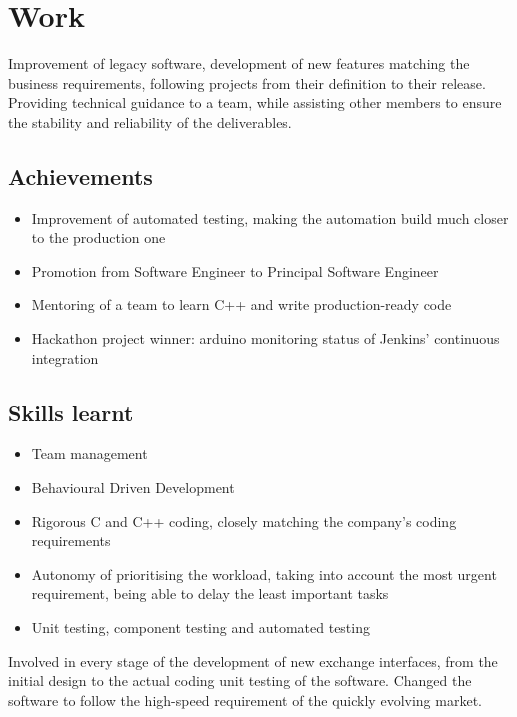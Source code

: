\documentclass{cv}
\begin{document}
\iffalse
\contact{address line 1}
        {address line 2}
        {address line 3}
        {....@.........}
        {+phone~number}
\fi

\section{Work}
{Improvement of legacy software, development of new features matching the business requirements, following projects from their definition to their release. Providing technical guidance to a team, while assisting other members to ensure the stability and reliability of the deliverables.}
\subsection{Achievements}
\begin{itemize}
    \item {Improvement of automated testing, making the automation build much closer to the production one}
    \item {Promotion from Software Engineer to Principal Software Engineer}
    \item {Mentoring of a team to learn C++ and write production-ready code}
    \item {Hackathon project winner: arduino monitoring status of Jenkins' continuous integration}
\end{itemize}
\subsection{Skills learnt}
\begin{itemize}
    \item {Team management}
    \item {Behavioural Driven Development}
    \item {Rigorous C and C++ coding, closely matching the company's coding requirements}
    \item {Autonomy of prioritising the workload, taking into account the most urgent requirement, being able to delay the least important tasks}
    \item {Unit testing, component testing and automated testing}
\end{itemize}

{Involved in every stage of the development of new exchange interfaces, from the initial design to the actual coding unit testing of the software.
Changed the software to follow the high-speed requirement of the quickly evolving market.}
\end{document}

